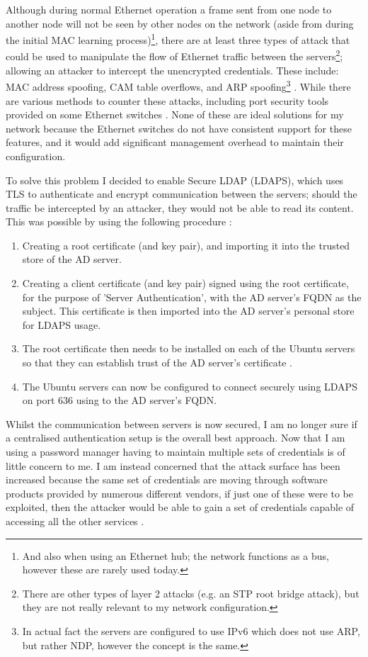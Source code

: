 \documentclass[11pt,a4paper]{scrartcl}
\begin{document}
\begin{refsection}
Although during normal Ethernet operation a frame sent from one node to another node will not be seen by other nodes on the network (aside from during the initial MAC learning process)\footnote{And also when using an Ethernet hub; the network functions as a bus, however these are rarely used today.}, there are at least three types of attack that could be used to manipulate the flow of Ethernet traffic between the servers\footnote{There are other types of layer 2 attacks (e.g. an STP root bridge attack), but they are not really relevant to my network configuration.}; allowing an attacker to intercept the unencrypted credentials.
These include: MAC address spoofing, CAM table overflows, and ARP spoofing\footnote{In actual fact the servers are configured to use IPv6 which does not use ARP, but rather NDP, however the concept is the same.} \cite{l2attacks}.
While there are various methods to counter these attacks, including port security tools provided on some Ethernet switches \cite[193]{odom_icnd1}.
None of these are ideal solutions for my network because the Ethernet switches do not have consistent support for these features, and it would add significant management overhead to maintain their configuration.

To solve this problem I decided to enable Secure LDAP (LDAPS), which uses TLS to authenticate and encrypt communication between the servers; should the traffic be intercepted by an attacker, they would not be able to read its content. This was possible by using the following procedure \cite{microsoft_enable_ldaps, ad_ldaps_gist}:
\begin{enumerate}
	\item Creating a root certificate (and key pair), and importing it into the trusted store of the AD server.
	\item Creating a client certificate (and key pair) signed using the root certificate, for the purpose of 'Server Authentication', with the AD server's FQDN as the subject. This certificate is then imported into the AD server's personal store for LDAPS usage.
	\item The root certificate then needs to be installed on each of the Ubuntu servers so that they can establish trust of the AD server's certificate \cite{ubuntu_ca_cert}.
	\item The Ubuntu servers can now be configured to connect securely using LDAPS on port 636 using to the AD server's FQDN.
\end{enumerate}

Whilst the communication between servers is now secured, I am no longer sure if a centralised authentication setup is the overall best approach. Now that I am using a password manager having to maintain multiple sets of credentials is of little concern to me. I am instead concerned that the attack surface has been increased because the same set of credentials are moving through software products provided by numerous different vendors, if just one of these were to be exploited, then the attacker would be able to gain a set of credentials capable of accessing all the other services \cite{huque_ldap,newington_ldap}.

\printbibliography
\end{refsection}
\end{document}
